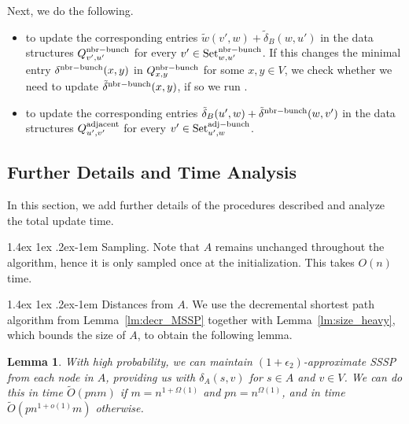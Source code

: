 \documentclass[11pt]{article}
\makeatletter
\newtheorem{lemma}[theorem]{Lemma}
\theoremstyle{definition}
\theoremstyle{remark}
\renewcommand{\paragraph}{%
  \@startsection{paragraph}{4}%
  {\z@}{1.4ex \@plus 1ex \@minus .2ex}{-1em}%
  {\normalfont\normalsize\bfseries}%
}
\makeatother
\begin{document}
\begin{titlepage}
    Next, we do the following. 
    \begin{itemize}
        \item {} to update the corresponding entries $\tilde w(v',w)+\tilde\delta_B(w,u')$ in the data structures $Q^{\rm{nbr-bunch}}_{v',u'}$ for every $v'\in \text{Set}^{\rm{nbr-bunch}}_{w,u'}$. If this changes the minimal entry $\delta^{\rm{nbr-bunch}}(x,y)$ in $Q^{\rm{nbr-bunch}}_{x,y}$ for some $x,y\in V$, we check whether we need to update $\tilde \delta^{\rm{nbr-bunch}}(x,y)$, if so we run . %
        \item {} to update the corresponding entries $\tilde\delta_B(u',w)+\tilde\delta^{\rm{nbr-bunch}}(w,v')$ in the data structures $Q^{\rm{adjacent}}_{u',v'}$ for every $v'\in \text{Set}^{\rm{adj-bunch}}_{u',w}$.
    \end{itemize}


\subsection{Further Details and Time Analysis}\label{sc:mult_time}
In this section, we add further details of the procedures described and analyze the total update time. 

\paragraph{Sampling.} Note that $A$ remains unchanged throughout the algorithm, hence it is only sampled once at the initialization. This takes $O(n)$ time. 

\paragraph{Distances from $A$.} We use the decremental shortest path algorithm from Lemma~\ref{lm:decr_MSSP} together with Lemma~\ref{lm:size_heavy}, which bounds the size of $A$, to obtain the following lemma. 

\begin{lemma}\label{lm:A_MSSP}
    With high probability, we can maintain $(1+\epsilon_2)$-approximate SSSP from each node in $A$, providing us with $\delta_A(s,v)$ for $s\in A$ and $v\in V$. We can do this in time $\tilde{O}(pnm)$ if $m=n^{1+\Omega(1)}$ and $pn=n^{\Omega(1)}$, and in time $\tilde O(pn^{1+o(1)}m)$ otherwise.
\end{lemma}


\end{titlepage}
\end{document}
